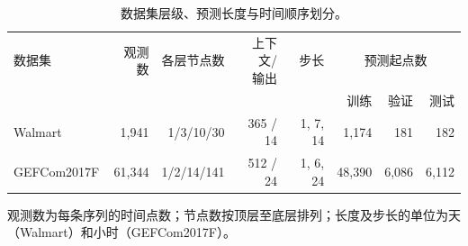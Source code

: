 \begin{table}[!htbp]
\centering
\caption{数据集层级、预测长度与时间顺序划分。}
\label{tab:data}
\footnotesize
\setlength{\tabcolsep}{3pt}
\begin{tabular*}{\textwidth}{@{\extracolsep{\fill}}lrrrrrrr@{}}
\toprule
数据集 & 观测数 & 各层节点数 & \shortstack{上下文/\\输出} & 步长 & \multicolumn{3}{c}{预测起点数} \\
\cmidrule(lr){6-8}
& & & & & 训练 & 验证 & 测试 \\
\midrule
Walmart & 1,941 & 1/3/10/30 & 365 / 14 & 1, 7, 14 & 1,174 & 181 & 182 \\
GEFCom2017F & 61,344 & 1/2/14/141 & 512 / 24 & 1, 6, 24 & 48,390 & 6,086 & 6,112 \\
\bottomrule
\end{tabular*}
\par\smallskip\begin{minipage}{\textwidth}\footnotesize 观测数为每条序列的时间点数；节点数按顶层至底层排列；长度及步长的单位为天（Walmart）和小时（GEFCom2017F）。\end{minipage}
\end{table}
